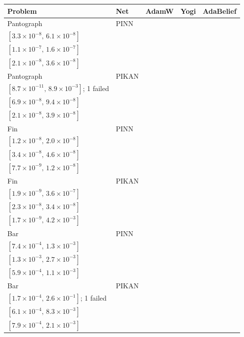 \begin{tabular}{llccc}
\toprule
Problem & Net & AdamW & Yogi & AdaBelief\\
\midrule
Pantograph & PINN & \makecell{$4.5{\times}10^{-8}$\\$[3.3{\times}10^{-8},\,6.1{\times}10^{-8}]$} & \makecell{$1.3{\times}10^{-7}$\\$[1.1{\times}10^{-7},\,1.6{\times}10^{-7}]$} & \makecell{$2.8{\times}10^{-8}$\\$[2.1{\times}10^{-8},\,3.6{\times}10^{-8}]$}\\
Pantograph & PIKAN & \makecell{$8.8{\times}10^{-7}$\\$[8.7{\times}10^{-11},\,8.9{\times}10^{-3}]$; 1 failed} & \makecell{$8.0{\times}10^{-8}$\\$[6.9{\times}10^{-8},\,9.4{\times}10^{-8}]$} & \makecell{$2.8{\times}10^{-8}$\\$[2.1{\times}10^{-8},\,3.9{\times}10^{-8}]$}\\
Fin & PINN & \makecell{$1.6{\times}10^{-8}$\\$[1.2{\times}10^{-8},\,2.0{\times}10^{-8}]$} & \makecell{$4.0{\times}10^{-8}$\\$[3.4{\times}10^{-8},\,4.6{\times}10^{-8}]$} & \makecell{$9.5{\times}10^{-9}$\\$[7.7{\times}10^{-9},\,1.2{\times}10^{-8}]$}\\
Fin & PIKAN & \makecell{$2.7{\times}10^{-8}$\\$[1.9{\times}10^{-9},\,3.6{\times}10^{-7}]$} & \makecell{$2.8{\times}10^{-8}$\\$[2.3{\times}10^{-8},\,3.4{\times}10^{-8}]$} & \makecell{$2.7{\times}10^{-6}$\\$[1.7{\times}10^{-9},\,4.2{\times}10^{-3}]$}\\
Bar & PINN & \makecell{$9.8{\times}10^{-4}$\\$[7.4{\times}10^{-4},\,1.3{\times}10^{-3}]$} & \makecell{$1.9{\times}10^{-3}$\\$[1.3{\times}10^{-3},\,2.7{\times}10^{-3}]$} & \makecell{$7.9{\times}10^{-4}$\\$[5.9{\times}10^{-4},\,1.1{\times}10^{-3}]$}\\
Bar & PIKAN & \makecell{$6.7{\times}10^{-3}$\\$[1.7{\times}10^{-4},\,2.6{\times}10^{-1}]$; 1 failed} & \makecell{$2.2{\times}10^{-3}$\\$[6.1{\times}10^{-4},\,8.3{\times}10^{-3}]$} & \makecell{$1.3{\times}10^{-3}$\\$[7.9{\times}10^{-4},\,2.1{\times}10^{-3}]$}\\

\end{tabular}
